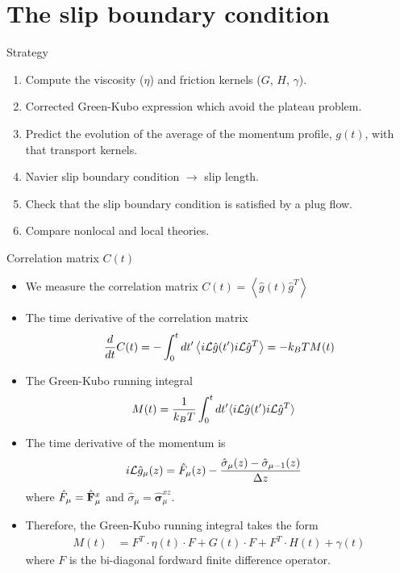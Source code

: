 \documentclass{beamer}
\newcommand{\esc}{\!\cdot\!}
\newcommand{\llangle}{\left\langle}
\newcommand{\rrangle}{\right\rangle}
\begin{document}
\section{The slip boundary condition}
\begin{frame}{Strategy}
  \begin{enumerate}
    \item Compute the viscosity ($\eta$) and friction kernels ($G$, $H$, $\gamma$).
    \item Corrected Green-Kubo expression which avoid the plateau problem. 
    \item Predict the evolution of the average of the momentum profile, $g(t)$, with that transport kernels. 
    \item Navier slip boundary condition $\rightarrow$ slip length. 
    \item Check that the slip boundary condition is satisfied by a plug flow.
    \item Compare nonlocal and local theories. 
  \end{enumerate}
\end{frame}

\begin{frame}{Correlation matrix $C(t)$}
  \begin{itemize}
    \item We measure the correlation matrix $C(t)=\llangle \hat{g}(t) \hat{g}^T \rrangle$
\item  The time derivative of the correlation matrix
\begin{align}
  \frac{d}{dt}C(t)
=-  \int_0^t dt' \llangle i{\cal L}\hat{g}(t') i{\cal L}\hat{g}^T\rrangle
=-  k_BT M(t)
\nonumber
\end{align}
\item The Green-Kubo running integral 
\begin{align}
M(t)&= \frac{1}{k_BT}\int_0^t dt'\langle i{\cal L}\hat{g}(t')i{\cal L} \hat{g}^T\rangle
\nonumber
\end{align}
\item The time derivative of the momentum is 
\begin{align}
  i{\cal L}\hat{g}_\mu(z) &=\hat{F}_\mu(z)-\frac{\hat{\sigma}_\mu(z)-\hat{\sigma}_{\mu-1}(z)}{\Delta z}
\nonumber
\end{align}
where
$\hat{F}_\mu=\hat{\bf                   F}_\mu^x$                  and
$\hat{\sigma}_\mu=\hat{\boldsymbol{\sigma}}^{xz}_\mu$.
\item Therefore, the Green-Kubo running integral takes the form  
\begin{align}
{M}(t)&=F^T\esc{\eta}(t)\esc F+{G}(t)\esc F+F^T\esc{H}(t)+{\gamma}(t)
\nonumber
\end{align}
where $F$ is the bi-diagonal fordward finite difference operator.
  \end{itemize}
\end{frame}
\end{document}
